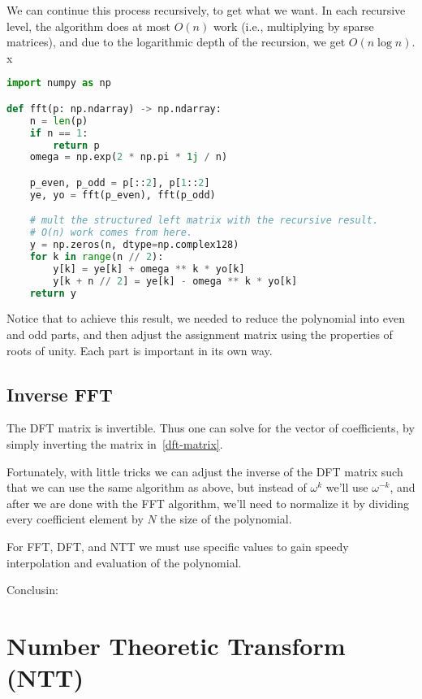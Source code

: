  We can continue this process recursively, to get what we want.
 In each recursive level, the algorithm does at most $O(n)$ work (i.e., multiplying by sparse matrices),
  and due to the logarithmic depth of the recursion, we get $O(n\log{n})$.
x
\label{algorithm:fft}
  \begin{lstlisting}[language=Python,
    caption={fft algorithm in python}
  ]
import numpy as np

def fft(p: np.ndarray) -> np.ndarray:
    n = len(p)
    if n == 1:
        return p
    omega = np.exp(2 * np.pi * 1j / n)

    p_even, p_odd = p[::2], p[1::2] 
    ye, yo = fft(p_even), fft(p_odd)

    # mult the structured left matrix with the recursive result.
    # O(n) work comes from here.
    y = np.zeros(n, dtype=np.complex128)
    for k in range(n // 2):
        y[k] = ye[k] + omega ** k * yo[k]
        y[k + n // 2] = ye[k] - omega ** k * yo[k]
    return y
    \end{lstlisting}
    
    \begin{remark}[Summary]
      Notice that to achieve this result, we needed to reduce the polynomial into
      even and odd parts, and then adjust the assignment matrix using
      the properties of roots of unity. Each part is important in its own way.
    \end{remark}
\subsection*{Inverse FFT}\label{ifft}

The DFT matrix is invertible.
Thus one can solve for the vector of coefficients,
by simply inverting the matrix in~\ref{dft-matrix}.

Fortunately, with little tricks we can adjust the inverse of the DFT matrix such that
we can use the same algorithm as above, but instead of
$\omega^k$ we'll use $\omega^{-k}$, and after we are done with the FFT
algorithm, we'll need to normalize it by dividing every coefficient element
by $N$ the size of the polynomial.

 \begin{corollary}
  For FFT, DFT, and NTT we must use specific values to gain speedy interpolation and
  evaluation of the polynomial. 
 \end{corollary}{Conclusin:}
 
\section*{Number Theoretic Transform (NTT)}

